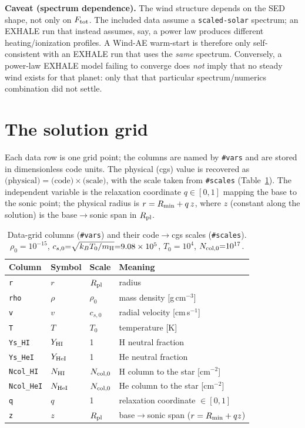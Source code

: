 \documentclass[english,a4paper]{my_memo}
\newcommand{\Rp}{\ensuremath{R_{\rm pl}}}
\newcommand{\code}[1]{\texttt{#1}}
\newcommand{\Ftot}{\ensuremath{F_{\rm tot}}}
\newcommand{\hd}[1]{\code{\##1}}      %
\begin{document}
\medskip\noindent\textbf{Caveat (spectrum dependence).} The wind structure
depends on the SED shape, not only on $\Ftot$. The included data assume a
\code{scaled-solar} spectrum; an EXHALE run that instead assumes, say, a
power law produces different heating/ionization profiles. A Wind-AE
warm-start is therefore only self-consistent with an EXHALE run that uses
the \emph{same} spectrum. Conversely, a power-law EXHALE model failing to
converge does \emph{not} imply that no steady wind exists for that planet:
only that that particular spectrum/numerics combination did not settle.

\section{The solution grid}
\label{sec:grid}
Each data row is one grid point; the columns are named by \hd{vars} and are
stored in dimensionless code units. The physical (cgs) value is recovered
as $\text{(physical)} = \text{(code)}\times\text{(scale)}$, with the scale
taken from \hd{scales} (Table~\ref{tab:grid}). The independent variable is
the relaxation coordinate $q\in[0,1]$ mapping the base to the sonic point;
the physical radius is $r = R_{\rm min} + q\,z$, where $z$ (constant along
the solution) is the base$\to$sonic span in $\Rp$.

\begin{table}[t]\centering\small
\caption{Data-grid columns (\hd{vars}) and their code$\to$cgs scales
(\hd{scales}). $\rho_0{=}10^{-15}$, $c_{s,0}{=}\sqrt{k_BT_0/m_{\rm H}}
{=}9.08\times10^{5}$, $T_0{=}10^{4}$, $N_{\rm col,0}{=}10^{17}$.}
\label{tab:grid}
\begin{tabular}{@{}l l l p{6.0cm}@{}}
\toprule
Column & Symbol & Scale & Meaning \\
\midrule
\code{r}        & $r$            & $\Rp$              & radius \\
\code{rho}      & $\rho$         & $\rho_0$           & mass density [g\,cm$^{-3}$] \\
\code{v}        & $v$            & $c_{s,0}$          & radial velocity [cm\,s$^{-1}$] \\
\code{T}        & $T$            & $T_0$              & temperature [K] \\
\code{Ys\_HI}   & $Y_{\rm HI}$   & 1                  & H neutral fraction \\
\code{Ys\_HeI}  & $Y_{\rm HeI}$  & 1                  & He neutral fraction \\
\code{Ncol\_HI} & $N_{\rm HI}$   & $N_{\rm col,0}$    & H column to the star [cm$^{-2}$] \\
\code{Ncol\_HeI}& $N_{\rm HeI}$  & $N_{\rm col,0}$    & He column to the star [cm$^{-2}$] \\
\code{q}        & $q$            & 1                  & relaxation coordinate $\in[0,1]$ \\
\code{z}        & $z$            & $\Rp$              & base$\to$sonic span ($r=R_{\rm min}+qz$) \\
\bottomrule
\end{tabular}
\end{table}
\end{document}
